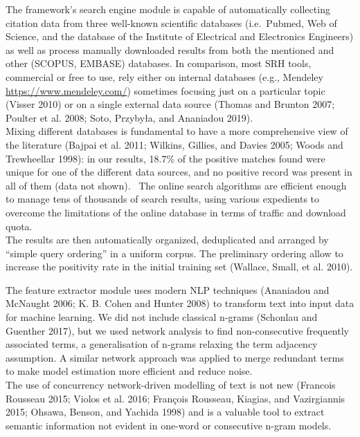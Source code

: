 \documentclass{article}
\begin{document}
The framework's search engine module is capable of automatically
collecting citation data from three well-known scientific databases
(i.e.~Pubmed, Web of Science, and the database of the Institute of
Electrical and Electronics Engineers) as well as process manually
downloaded results from both the mentioned and other (SCOPUS, EMBASE)
databases. In comparison, most SRH tools, commercial or free to use,
rely either on internal databases (e.g., Mendeley
\url{https://www.mendeley.com/}) sometimes focusing just on a particular
topic (Visser 2010) or on a single external data source (Thomas and
Brunton 2007; Poulter et al. 2008; Soto, Przybyła, and Ananiadou
2019).\\
Mixing different databases is fundamental to have a more comprehensive
view of the literature (Bajpai et al. 2011; Wilkins, Gillies, and Davies
2005; Woods and Trewheellar 1998): in our results, 18.7\% of the
positive matches found were unique for one of the different data
sources, and no positive record was present in all of them (data not
shown).~ The online search algorithms are efficient enough to manage
tens of thousands of search results, using various expedients to
overcome the limitations of the online database in terms of traffic and
download quota.\\
The results are then automatically organized, deduplicated and arranged
by ``simple query ordering'' in a uniform corpus. The preliminary
ordering allow to increase the positivity rate in the initial training
set (Wallace, Small, et al. 2010).

The feature extractor module uses modern NLP techniques (Ananiadou and
McNaught 2006; K. B. Cohen and Hunter 2008) to transform text into input
data for machine learning. We did not include classical n-grams
(Schonlau and Guenther 2017), but we used network analysis to find
non-consecutive frequently associated terms, a generalisation of n-grams
relaxing the term adjacency assumption. A similar network approach was
applied to merge redundant terms to make model estimation more efficient
and reduce noise.\\
The use of concurrency network-driven modelling of text is not new
(Francois Rousseau 2015; Violos et al. 2016; François Rousseau, Kiagias,
and Vazirgiannis 2015; Ohsawa, Benson, and Yachida 1998) and is a
valuable tool to extract semantic information not evident in one-word or
consecutive n-gram models.\\
\end{document}

